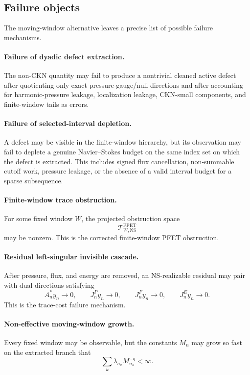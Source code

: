 \documentclass[11pt]{article}
\numberwithin{equation}{section}
\theoremstyle{plain}
\theoremstyle{definition}
\theoremstyle{remark}
\newcommand{\NS}{\mathrm{NS}}
\newcommand{\PFET}{\mathrm{PFET}}
\begin{document}
\subsection{Failure objects}

The moving-window alternative leaves a precise list of possible failure
mechanisms.

\paragraph{Failure of dyadic defect extraction.}
The non-CKN quantity may fail to produce a nontrivial cleaned active defect
after quotienting only exact pressure-gauge/null directions and after accounting for harmonic-pressure leakage, localization leakage, CKN-small components, and finite-window tails as errors.

\paragraph{Failure of selected-interval depletion.}
A defect may be visible in the finite-window hierarchy, but its observation may
fail to deplete a genuine Navier--Stokes budget on the same index set on which
the defect is extracted.  This includes signed flux cancellation, non-summable
cutoff work, pressure leakage, or the absence of a valid interval budget for a
sparse subsequence.

\paragraph{Finite-window trace obstruction.}
For some fixed window \(W\), the projected obstruction space
\[
        \mathcal T_{W,\NS}^{\PFET}
\]
may be nonzero.  This is the corrected finite-window PFET obstruction.

\paragraph{Residual left-singular invisible cascade.}
After pressure, flux, and energy are removed, an NS-realizable residual may pair
with dual directions satisfying
\[
        A_n^*y_n\to0,
        \qquad
        J_n^Py_n\to0,
        \qquad
        J_n^Fy_n\to0,
        \qquad
        J_n^Ey_n\to0.
\]
This is the trace-cost failure mechanism.

\paragraph{Non-effective moving-window growth.}
Every fixed window may be observable, but the constants \(M_n\) may grow so fast
on the extracted branch that
\[
        \sum_{k}\lambda_{n_k}M_{n_k}^{-q}<\infty.
\]
\end{document}
